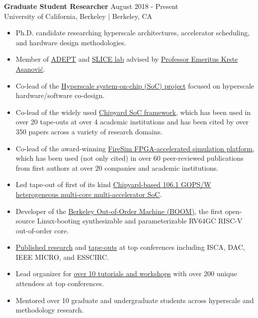 \documentclass[line]{res}
\begin{document}
\begin{resume}
\textbf{Graduate Student Researcher} \hfill August 2018 - Present
\\
University of California, Berkeley | Berkeley, CA
\\
\vspace{-3mm}
\begin{itemize}
\item Ph.D. candidate researching hyperscale architectures, accelerator scheduling, and hardware design methodologies.
\item Member of \href{https://adept.eecs.berkeley.edu/}{ADEPT} and \href{https://slice.eecs.berkeley.edu/}{SLICE lab} advised by \href{https://people.eecs.berkeley.edu/~krste/}{Professor Emeritus Krste Asanovi\'c}.
\item Co-lead of the \hyperref[sec:hyperscale-soc]{Hyperscale system-on-chip (SoC) project} focused on hyperscale hardware/software co-design.
\item Co-lead of the widely used \hyperref[sec:chipyard]{Chipyard SoC framework}, which has been used in over 20 tape-outs at over 4 academic institutions and has been cited by over 350 papers across a variety of research domains.
\item Co-lead of the award-winning \hyperref[sec:firesim]{FireSim FPGA-accelerated simulation platform}, which has been used (not only cited) in over 60 peer-reviewed publications from first authors at over 20 companies and academic institutions.
\item Led tape-out of first of its kind \hyperref[sec:beagle]{Chipyard-based 106.1 GOPS/W heterogeneous multi-core multi-accelerator SoC}.
\item Developer of the \hyperref[sec:boom]{Berkeley Out-of-Order Machine (BOOM)}, the first open-source Linux-booting synthesizable and parameterizable RV64GC RISC-V out-of-order core.
\item \hyperref[sec:pubs]{Published research} and \hyperref[sec:beagle]{tape-outs} at top conferences including ISCA, DAC, IEEE MICRO, and ESSCIRC.
\item Lead organizer for \hyperref[sec:tutorialsworkshops]{over 10 tutorials and workshops} with over 200 unique attendees at top conferences.
\item Mentored over 10 graduate and undergraduate students across hyperscale and methodology research.
\end{itemize}


\end{resume}
\end{document}
